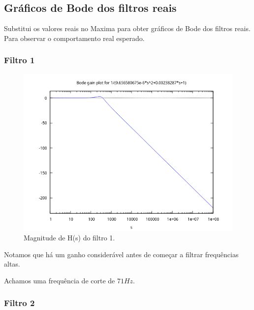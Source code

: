 \documentclass[12pt,twoside, a4paper, twocolumn]{article}
\begin{document}
\subsection{Gráficos de Bode dos filtros reais}


Substitui os valores reais no Maxima para obter gráficos de Bode dos filtros reais. Para observar o comportamento real esperado.


\subsubsection{Filtro 1}


\begin{figure}[h]
    \centering
    \includegraphics[width=1\columnwidth]{images/bodegainH1.png}
    \caption{Magnitude de H(s) do filtro 1.}
\end{figure}


Notamos que há um ganho considerável antes de começar a filtrar frequências altas.


Achamos uma frequência de corte de $71Hz$.


\subsubsection{Filtro 2}
\end{document}
